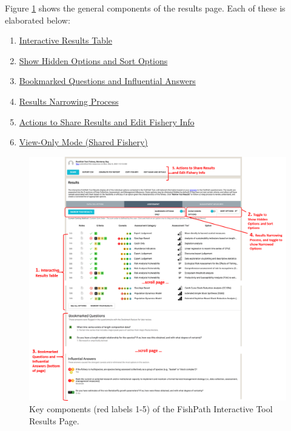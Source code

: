 \documentclass[
  11pt,
]{book}
\providecommand{\tightlist}{%
  \setlength{\itemsep}{0pt}\setlength{\parskip}{0pt}}
\begin{document}
Figure \ref{fig:results-components} shows the general components of the results page. Each of these is elaborated below:

\begin{enumerate}
\def\labelenumi{\arabic{enumi}.}
\tightlist
\item
  \protect\hyperlink{interactive-results-table}{Interactive Results Table}
\item
  \protect\hyperlink{show-hidden-options-and-sort-options}{Show Hidden Options and Sort Options}
\item
  \protect\hyperlink{bookmarked-questions-and-influential-answers}{Bookmarked Questions and Influential Answers}
\item
  \protect\hyperlink{Results-Narrowing}{Results Narrowing Process}
\item
  \protect\hyperlink{Results-Actions}{Actions to Share Results and Edit Fishery Info}
\item
  \protect\hyperlink{view-only-mode-shared-fishery}{View-Only Mode (Shared Fishery)}
\end{enumerate}

\begin{figure}

{\centering \includegraphics[width=0.95\linewidth]{images/results-components} 

}

\caption{Key components (red labels 1-5) of the FishPath Interactive Tool Results Page.}\label{fig:results-components}
\end{figure}
\end{document}
